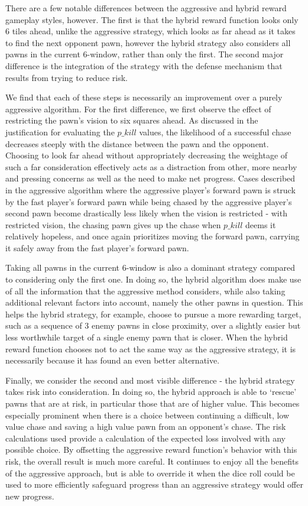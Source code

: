 \documentclass{article} %
\begin{document}
There are a few notable differences between the aggressive and hybrid reward gameplay styles, however. The first is that the hybrid reward function looks only 6 tiles ahead, unlike the aggressive strategy, which looks as far ahead as it takes to find the next opponent pawn, however the hybrid strategy also considers all pawns in the current 6-window, rather than only the first. The second major difference is the integration of the strategy with the defense mechanism that results from trying to reduce risk.

We find that each of these steps is necessarily an improvement over a purely aggressive algorithm. For the first difference, we first observe the effect of restricting the pawn’s vision to six squares ahead. As discussed in the justification for evaluating the $p\_kill$ values, the likelihood of a successful chase decreases steeply with the distance between the pawn and the opponent. Choosing to look far ahead without appropriately decreasing the weightage of such a far consideration effectively acts as a distraction from other, more nearby and pressing concerns as well as the need to make net progress. Cases described in the aggressive algorithm where the aggressive player’s forward pawn is struck by the fast player’s forward pawn while being chased by the aggressive player’s second pawn become drastically less likely when the vision is restricted - with restricted vision, the chasing pawn gives up the chase when $p\_kill$ deems it relatively hopeless, and once again prioritizes moving the forward pawn, carrying it safely away from the fast player’s forward pawn.

Taking all pawns in the current 6-window is also a dominant strategy compared to considering only the first one. In doing so, the hybrid algorithm does make use of all the information that the aggressive method considers, while also taking additional relevant factors into account, namely the other pawns in question. This helps the hybrid strategy, for example, choose to pursue a more rewarding target, such as a sequence of 3 enemy pawns in close proximity, over a slightly easier but less worthwhile target of a single enemy pawn that is closer. When the hybrid reward function chooses not to act the same way as the aggressive strategy, it is necessarily because it has found an even better alternative.

Finally, we consider the second and most visible difference - the hybrid strategy takes risk into consideration. In doing so, the hybrid approach is able to ‘rescue’ pawns that are at risk, in particular those that are of higher value. This becomes especially prominent when there is a choice between continuing a difficult, low value chase and saving a high value pawn from an opponent’s chase. The risk calculations used provide a calculation of the expected loss involved with any possible choice. By offsetting the aggressive reward function’s behavior with this risk, the overall result is much more careful. It continues to enjoy all the benefits of the aggressive approach, but is able to override it when the dice roll could be used to more efficiently safeguard progress than an aggressive strategy would offer new progress.
\end{document}
